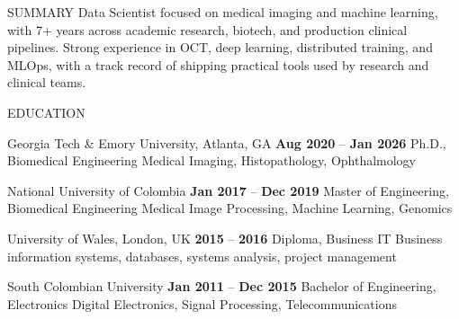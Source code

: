 \documentclass{resume} %
\begin{document}
\begin{rSection}{SUMMARY}
Data Scientist focused on medical imaging and machine learning, with 7+ years across academic research, biotech, and production clinical pipelines. Strong experience in OCT, deep learning, distributed training, and MLOps, with a track record of shipping practical tools used by research and clinical teams.
\end{rSection}
\begin{rSection}{EDUCATION}
\begin{rSchool}{Georgia Tech \& Emory University, Atlanta, GA}
  {\textbf{Aug 2020} -- \textbf{Jan 2026}}
  {Ph.D., Biomedical Engineering}
  {Medical Imaging, Histopathology, Ophthalmology}
  {}
\end{rSchool}
%
\begin{rSchool}{National University of Colombia}
  {\textbf{Jan 2017} -- \textbf{Dec 2019}}
  {Master of Engineering, Biomedical Engineering}
  {Medical Image Processing, Machine Learning, Genomics}
  {}
\end{rSchool}
%
\begin{rSchool}{University of Wales, London, UK}
  {\textbf{2015} -- \textbf{2016}}
  {Diploma, Business IT}
  {Business information systems, databases, systems analysis, project management}
  {}
\end{rSchool}
%
\begin{rSchool}{South Colombian University}
  {\textbf{Jan 2011} -- \textbf{Dec 2015}}
  {Bachelor of Engineering, Electronics}
  {Digital Electronics, Signal Processing, Telecommunications}
  {}
\end{rSchool}
\end{rSection}
\end{document}
